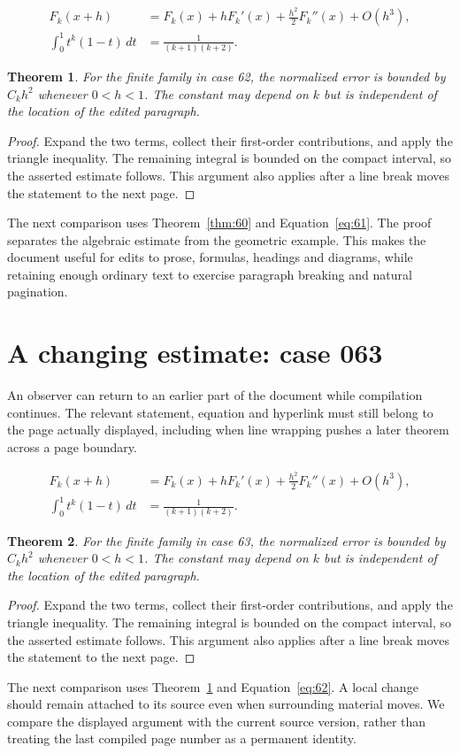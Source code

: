 \documentclass[a4paper,10pt]{article}
\newtheorem{theorem}{Theorem}[section]
\begin{document}
\lipsum[4-5]
\begin{align}\label{eq:61}
 F_k(x+h)&=F_k(x)+hF_k'(x)+\frac{h^2}{2}F_k''(x)+O(h^3),\\
 \int_0^1 t^k(1-t)\,dt&=\frac{1}{(k+1)(k+2)}.
\end{align}
\begin{theorem}\label{thm:61}
For the finite family in case 62, the normalized error is bounded by $C_k h^2$ whenever $0<h<1$. The constant may depend on $k$ but is independent of the location of the edited paragraph.
\end{theorem}
\begin{proof}
Expand the two terms, collect their first-order contributions, and apply the
triangle inequality. The remaining integral is bounded on the compact interval,
so the asserted estimate follows. This argument also applies after a line break
moves the statement to the next page.
\end{proof}
The next comparison uses Theorem~\ref{thm:60} and Equation~\ref{eq:61}. The proof separates the algebraic estimate from the geometric example. This makes the document useful for edits to prose, formulas, headings and diagrams, while retaining enough ordinary text to exercise paragraph breaking and natural pagination.

\lipsum[8]

\section{A changing estimate: case 063}\label{unit:62}
An observer can return to an earlier part of the document while compilation continues. The relevant statement, equation and hyperlink must still belong to the page actually displayed, including when line wrapping pushes a later theorem across a page boundary.

\lipsum[7-8]
\begin{align}\label{eq:62}
 F_k(x+h)&=F_k(x)+hF_k'(x)+\frac{h^2}{2}F_k''(x)+O(h^3),\\
 \int_0^1 t^k(1-t)\,dt&=\frac{1}{(k+1)(k+2)}.
\end{align}
\begin{theorem}\label{thm:62}
For the finite family in case 63, the normalized error is bounded by $C_k h^2$ whenever $0<h<1$. The constant may depend on $k$ but is independent of the location of the edited paragraph.
\end{theorem}
\begin{proof}
Expand the two terms, collect their first-order contributions, and apply the
triangle inequality. The remaining integral is bounded on the compact interval,
so the asserted estimate follows. This argument also applies after a line break
moves the statement to the next page.
\end{proof}
The next comparison uses Theorem~\ref{thm:61} and Equation~\ref{eq:62}. A local change should remain attached to its source even when surrounding material moves. We compare the displayed argument with the current source version, rather than treating the last compiled page number as a permanent identity.
\end{document}
